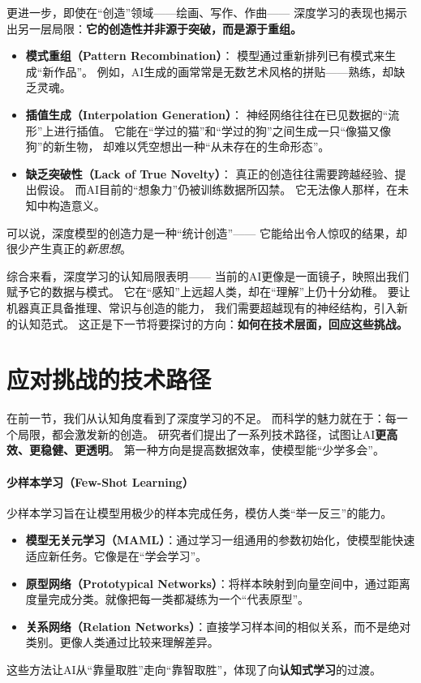 更进一步，即使在“创造”领域——绘画、写作、作曲——  
深度学习的表现也揭示出另一层局限：\textbf{它的创造性并非源于突破，而是源于重组。}  

\begin{itemize}
\item \textbf{模式重组（Pattern Recombination）}：  
  模型通过重新排列已有模式来生成“新作品”。  
  例如，AI生成的画常常是无数艺术风格的拼贴——熟练，却缺乏灵魂。  

\item \textbf{插值生成（Interpolation Generation）}：  
  神经网络往往在已见数据的“流形”上进行插值。  
  它能在“学过的猫”和“学过的狗”之间生成一只“像猫又像狗”的新生物，  
  却难以凭空想出一种“从未存在的生命形态”。  

\item \textbf{缺乏突破性（Lack of True Novelty）}：  
  真正的创造往往需要跨越经验、提出假设。  
  而AI目前的“想象力”仍被训练数据所囚禁。  
  它无法像人那样，在未知中构造意义。  
\end{itemize}
可以说，深度模型的创造力是一种“统计创造”——  
它能给出令人惊叹的结果，却很少产生真正的\textit{新思想}。

综合来看，深度学习的认知局限表明——  
当前的AI更像是一面镜子，映照出我们赋予它的数据与模式。  
它在“感知”上远超人类，却在“理解”上仍十分幼稚。  
要让机器真正具备推理、常识与创造的能力，  
我们需要超越现有的神经结构，引入新的认知范式。  
这正是下一节将要探讨的方向：\textbf{如何在技术层面，回应这些挑战。}

\section{应对挑战的技术路径}

在前一节，我们从认知角度看到了深度学习的不足。  
而科学的魅力就在于：每一个局限，都会激发新的创造。  
研究者们提出了一系列技术路径，试图让AI\textbf{更高效、更稳健、更透明}。  
第一种方向是提高数据效率，使模型能“少学多会”。

\paragraph{少样本学习（Few-Shot Learning）}  
少样本学习旨在让模型用极少的样本完成任务，模仿人类“举一反三”的能力。  
\begin{itemize}
\item \textbf{模型无关元学习（MAML）}：通过学习一组通用的参数初始化，使模型能快速适应新任务。它像是在“学会学习”。  
\item \textbf{原型网络（Prototypical Networks）}：将样本映射到向量空间中，通过距离度量完成分类。就像把每一类都凝练为一个“代表原型”。  
\item \textbf{关系网络（Relation Networks）}：直接学习样本间的相似关系，而不是绝对类别。更像人类通过比较来理解差异。  
\end{itemize}
这些方法让AI从“靠量取胜”走向“靠智取胜”，体现了向\textbf{认知式学习}的过渡。

